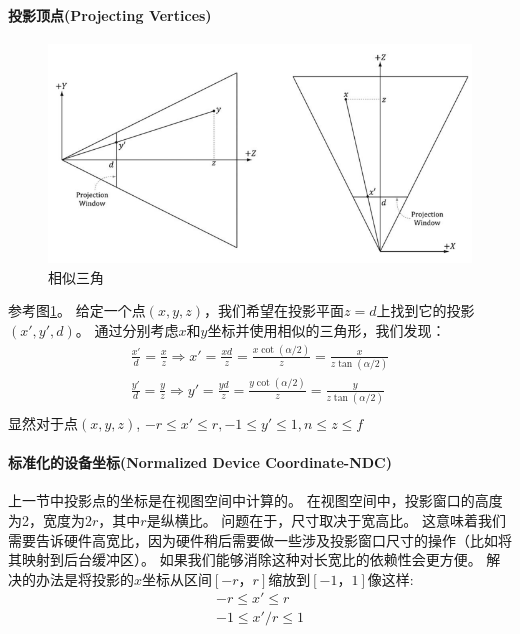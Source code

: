 \documentclass[11pt,a4paper,oldfontcommands]{memoir}
\begin{document}
{\paragraph{投影顶点(Projecting Vertices)}
\begin{figure}[t]
    \includegraphics[width=\textwidth]{5-24}
    \centering
    \caption{相似三角}
    \label{fig:5-24}
\end{figure}
\begin{flushleft}
参考图\ref{fig:5-24}。 给定一个点$(x,y,z)$，我们希望在投影平面$z = d$上找到它的投影$(x',y',d)$。 通过分别考虑$x$和$y$坐标并使用相似的三角形，我们发现：
\begin{align*}
\frac{x'}{d}=\frac{x}{z}\Rightarrow x'=\frac{xd}{z}=\frac{x\cot(\alpha/2)}{z}=\frac{x}{z\tan(\alpha/2)}\\
\frac{y'}{d}=\frac{y}{z}\Rightarrow y'=\frac{yd}{z}=\frac{y\cot(\alpha/2)}{z}=\frac{y}{z\tan(\alpha/2)}\\
\end{align*}
显然对于点$(x,y,z)$, $-r\leq x'\leq r,-1\leq y'\leq 1,n\leq z\leq f$
\end{flushleft}

\paragraph{标准化的设备坐标(Normalized Device Coordinate-NDC)}
\begin{flushleft}
上一节中投影点的坐标是在视图空间中计算的。 在视图空间中，投影窗口的高度为2，宽度为$2r$，其中$r$是纵横比。 问题在于，尺寸取决于宽高比。 这意味着我们需要告诉硬件高宽比，因为硬件稍后需要做一些涉及投影窗口尺寸的操作（比如将其映射到后台缓冲区）。 如果我们能够消除这种对长宽比的依赖性会更方便。 解决的办法是将投影的$x$坐标从区间$[-r，r]$缩放到$[-1，1]$像这样:
\begin{align*}
-r\leq x' \leq r \\
-1\leq x'/r \leq 1
\end{align*}


\end{flushleft}}
\end{document}
